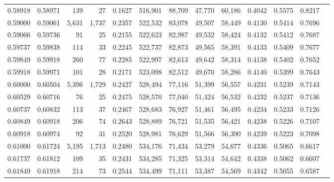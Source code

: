 \begin{tabular}{rrrrrrrrrrrrr}
0.58918 & 0.58971 &    139 &    27 &                                     0.1627 & 516,901 &  88,709 &  47,770 &  60,186 & 0.4042 & 0.5575 & 0.8217 \\
0.59000 & 0.59061 &  5,631 & 1,737 &                                     0.2357 & 522,532 &  83,078 &  49,507 &  58,449 & 0.4130 & 0.5414 & 0.7696 \\
0.59066 & 0.59736 &     91 &    25 &                                     0.2155 & 522,623 &  82,987 &  49,532 &  58,424 & 0.4132 & 0.5412 & 0.7687 \\
0.59737 & 0.59838 &    114 &    33 &                                     0.2245 & 522,737 &  82,873 &  49,565 &  58,391 & 0.4133 & 0.5409 & 0.7677 \\
0.59849 & 0.59918 &    260 &    77 &                                     0.2285 & 522,997 &  82,613 &  49,642 &  58,314 & 0.4138 & 0.5402 & 0.7652 \\
0.59918 & 0.59971 &    101 &    28 &                                     0.2171 & 523,098 &  82,512 &  49,670 &  58,286 & 0.4140 & 0.5399 & 0.7643 \\
0.60000 & 0.60504 &  5,396 & 1,729 &                                     0.2427 & 528,494 &  77,116 &  51,399 &  56,557 & 0.4231 & 0.5239 & 0.7143 \\
0.60529 & 0.60716 &     76 &    25 &                                     0.2475 & 528,570 &  77,040 &  51,424 &  56,532 & 0.4232 & 0.5237 & 0.7136 \\
0.60737 & 0.60832 &    113 &    37 &                                     0.2467 & 528,683 &  76,927 &  51,461 &  56,495 & 0.4234 & 0.5233 & 0.7126 \\
0.60849 & 0.60918 &    206 &    74 &                                     0.2643 & 528,889 &  76,721 &  51,535 &  56,421 & 0.4238 & 0.5226 & 0.7107 \\
0.60918 & 0.60974 &     92 &    31 &                                     0.2520 & 528,981 &  76,629 &  51,566 &  56,390 & 0.4239 & 0.5223 & 0.7098 \\
0.61000 & 0.61724 &  5,195 & 1,713 &                                     0.2480 & 534,176 &  71,434 &  53,279 &  54,677 & 0.4336 & 0.5065 & 0.6617 \\
0.61737 & 0.61812 &    109 &    35 &                                     0.2431 & 534,285 &  71,325 &  53,314 &  54,642 & 0.4338 & 0.5062 & 0.6607 \\
0.61849 & 0.61918 &    214 &    73 &                                     0.2544 & 534,499 &  71,111 &  53,387 &  54,569 & 0.4342 & 0.5055 & 0.6587 \\

\end{tabular}
